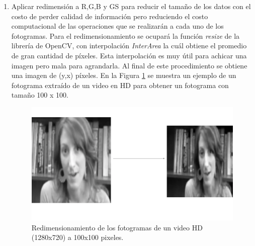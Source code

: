 \begin{onehalfspacing}
\begin{enumerate}
    \item Aplicar redimensión a R,G,B y GS para reducir el tamaño de los datos con el costo de perder calidad de información pero reduciendo el costo computacional de las operaciones que se realizarán a cada uno de los fotogramas. Para el redimensionamiento se ocupará la función \textit{resize} de la librería de OpenCV, con interpolación \textit{InterArea} la cuál obtiene el promedio de gran cantidad de píxeles. Esta interpolación es muy útil para achicar una imagen pero mala para agrandarla. Al final de este procedimiento se obtiene una imagen de (y,x) píxeles. En la Figura \ref{fig:Fig_Dataset1_Redimensionar} se muestra un ejemplo de un fotograma extraído de un video en HD para obtener un fotograma con tamaño 100 x 100.
    \begin{figure}[h!]
    	\centering
    	\includegraphics[width=12cm,keepaspectratio]{XX_Figures/Fig_Dataset1_Redimensionar.png}
    	\caption{\footnotesize Redimensionamiento de los fotogramas de un video HD (1280x720) a 100x100 pixeles.}
    	\label{fig:Fig_Dataset1_Redimensionar}
    \end{figure}


\end{enumerate}
\end{onehalfspacing}
